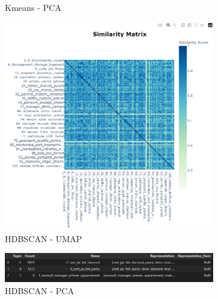 \begin{figure}[H]
\begin{subfigure}{0.43\textwidth}
        \caption{Kmeans - PCA}
    \end{subfigure}
    \begin{subfigure}{0.43\textwidth}
        \includegraphics[width=\linewidth]{images/results/cam/hdbscan-umap.png}
        \caption{HDBSCAN - UMAP}
    \end{subfigure}
    \begin{subfigure}{0.43\textwidth}
        \includegraphics[width=\linewidth]{images/results/cam/hdbscan_pca.png}
        \caption{HDBSCAN - PCA}
    \end{subfigure}
    \begin{subfigure}{0.43\textwidth}

\end{subfigure}
\end{figure}
